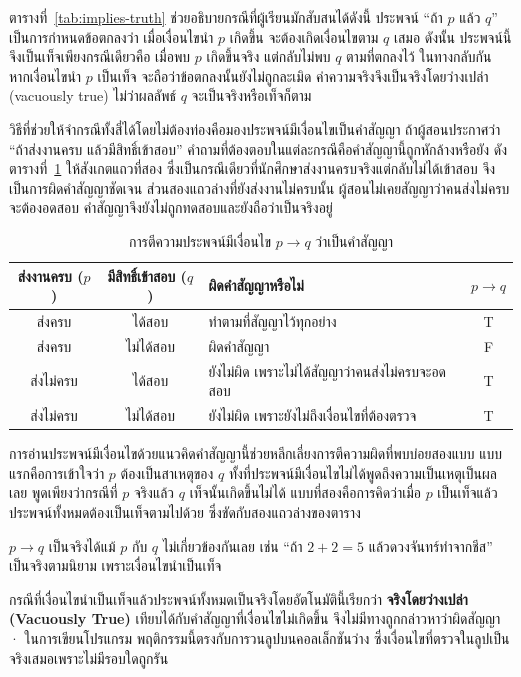 ตารางที่~\ref{tab:implies-truth} ช่วยอธิบายกรณีที่ผู้เรียนมักสับสนได้ดังนี้ ประพจน์ ``ถ้า $p$ แล้ว $q$'' เป็นการกำหนดข้อตกลงว่า เมื่อเงื่อนไขนำ $p$ เกิดขึ้น จะต้องเกิดเงื่อนไขตาม $q$ เสมอ ดังนั้น ประพจน์นี้จึงเป็นเท็จเพียงกรณีเดียวคือ เมื่อพบ $p$ เกิดขึ้นจริง แต่กลับไม่พบ $q$ ตามที่ตกลงไว้ ในทางกลับกัน หากเงื่อนไขนำ $p$ เป็นเท็จ จะถือว่าข้อตกลงนั้นยังไม่ถูกละเมิด ค่าความจริงจึงเป็นจริงโดยว่างเปล่า (vacuously true) ไม่ว่าผลลัพธ์ $q$ จะเป็นจริงหรือเท็จก็ตาม

วิธีที่ช่วยให้จำกรณีทั้งสี่ได้โดยไม่ต้องท่องคือมองประพจน์มีเงื่อนไขเป็นคำสัญญา ถ้าผู้สอนประกาศว่า ``ถ้าส่งงานครบ แล้วมีสิทธิ์เข้าสอบ'' คำถามที่ต้องตอบในแต่ละกรณีคือคำสัญญานี้ถูกหักล้างหรือยัง ดังตารางที่~\ref{tab:conditional-promise} ให้สังเกตแถวที่สอง ซึ่งเป็นกรณีเดียวที่นักศึกษาส่งงานครบจริงแต่กลับไม่ได้เข้าสอบ จึงเป็นการผิดคำสัญญาชัดเจน ส่วนสองแถวล่างที่ยังส่งงานไม่ครบนั้น ผู้สอนไม่เคยสัญญาว่าคนส่งไม่ครบจะต้องอดสอบ คำสัญญาจึงยังไม่ถูกทดสอบและยังถือว่าเป็นจริงอยู่

\begin{table}[H]
    \centering
    \caption{การตีความประพจน์มีเงื่อนไข $p \rightarrow q$ ว่าเป็นคำสัญญา}
    \label{tab:conditional-promise}
    \renewcommand{\arraystretch}{1.2}
    \begin{tabular}{|c|c|l|c|}
        \hline
        \textbf{ส่งงานครบ ($p$)} & \textbf{มีสิทธิ์เข้าสอบ ($q$)} & \textbf{ผิดคำสัญญาหรือไม่} & \textbf{$p \rightarrow q$} \\ \hline
        ส่งครบ & ได้สอบ & ทำตามที่สัญญาไว้ทุกอย่าง & T \\ \hline
        ส่งครบ & ไม่ได้สอบ & ผิดคำสัญญา & F \\ \hline
        ส่งไม่ครบ & ได้สอบ & ยังไม่ผิด เพราะไม่ได้สัญญาว่าคนส่งไม่ครบจะอดสอบ & T \\ \hline
        ส่งไม่ครบ & ไม่ได้สอบ & ยังไม่ผิด เพราะยังไม่ถึงเงื่อนไขที่ต้องตรวจ & T \\ \hline
    \end{tabular}
\end{table}

การอ่านประพจน์มีเงื่อนไขด้วยแนวคิดคำสัญญานี้ช่วยหลีกเลี่ยงการตีความผิดที่พบบ่อยสองแบบ แบบแรกคือการเข้าใจว่า $p$ ต้องเป็นสาเหตุของ $q$ ทั้งที่ประพจน์มีเงื่อนไขไม่ได้พูดถึงความเป็นเหตุเป็นผลเลย พูดเพียงว่ากรณีที่ $p$ จริงแล้ว $q$ เท็จนั้นเกิดขึ้นไม่ได้ แบบที่สองคือการคิดว่าเมื่อ $p$ เป็นเท็จแล้วประพจน์ทั้งหมดต้องเป็นเท็จตามไปด้วย ซึ่งขัดกับสองแถวล่างของตาราง

\begin{warning}
$p \rightarrow q$ เป็นจริงได้แม้ $p$ กับ $q$ ไม่เกี่ยวข้องกันเลย เช่น ``ถ้า $2+2=5$ แล้วดวงจันทร์ทำจากชีส'' เป็นจริงตามนิยาม เพราะเงื่อนไขนำเป็นเท็จ

กรณีที่เงื่อนไขนำเป็นเท็จแล้วประพจน์ทั้งหมดเป็นจริงโดยอัตโนมัตินี้เรียกว่า \textbf{จริงโดยว่างเปล่า (Vacuously True)} เทียบได้กับคำสัญญาที่เงื่อนไขไม่เกิดขึ้น จึงไม่มีทางถูกกล่าวหาว่าผิดสัญญา · ในการเขียนโปรแกรม พฤติกรรมนี้ตรงกับการวนลูปบนคอลเล็กชันว่าง ซึ่งเงื่อนไขที่ตรวจในลูปเป็นจริงเสมอเพราะไม่มีรอบใดถูกรัน
\end{warning}

